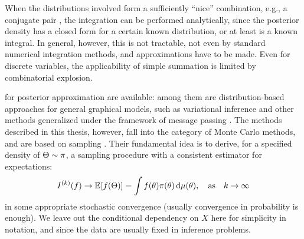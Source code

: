 When the distributions involved form a sufficiently \enquote{nice} combination, e.g., a conjugate
pair \parencites[see][chapter 2.2.2]{marin2007bayesian}[chapter
9.2.5]{murphy2012machine}, the integration can be performed analytically, since the posterior
density has a closed form for a certain known distribution, or at least is a known integral.  In
general, however, this is not tractable, not even by standard numerical integration methods, and
approximations have to be made.  Even for discrete variables, the applicability of simple summation
is limited by combinatorial explosion.

 for posterior approximation are available: among them are
distribution-based approaches for general graphical models, such as variational inference
\parencite[chapter 21 and 22]{murphy2012machine} and other methods generalized under the framework
of message passing \parencite{minka2005divergence}.  The methods described in this thesis, however,
fall into the category of Monte Carlo methods, and are based on sampling \parencites[chapter
23]{murphy2012machine}{vihola2020lectures}.  Their fundamental idea is to derive, for a specified
density of \(\Theta \sim \pi\), a sampling procedure with a consistent estimator for expectations:
\begin{equation}
  \label{eq:mc-methods}
  \kth{I}(f) \to \Exp{f(\Theta)} = \int f(\theta) \pi(\theta) \dif\mu(\theta), \quad \text{as} \quad k
  \to \infty
\end{equation}
in some appropriate stochastic convergence (usually convergence in probability is enough).  We leave
out the conditional dependency on \(X\) here for simplicity in notation, and since the data are
usually fixed in inference problems.

